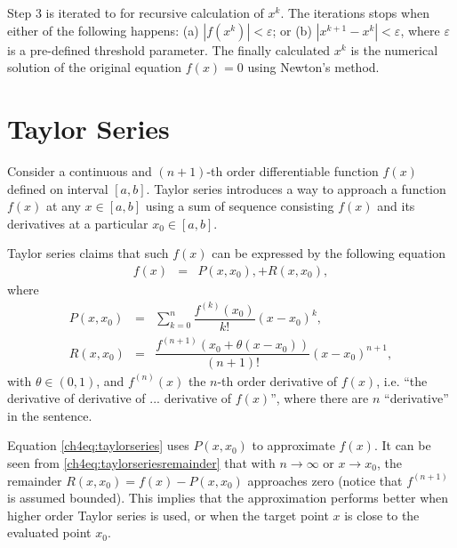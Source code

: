Step 3 is iterated to for recursive calculation of $x^{k}$. The iterations stops when either of the following happens: (a) $|f(x^k)| < \varepsilon$; or (b) $|x^{k+1}-x^k|<\varepsilon$, where $\varepsilon$ is a pre-defined threshold parameter. The finally calculated $x^k$ is the numerical solution of the original equation $f(x)=0$ using Newton's method.

\section{Taylor Series} \label{ch4sec:taylorseries}

Consider a continuous and $(n+1)$-th order differentiable function $f(x)$ defined on interval $[a, b]$. Taylor series introduces a way to approach a function $f(x)$ at any $x \in [a, b]$ using a sum of sequence consisting $f(x)$ and its derivatives at a particular $x_0 \in [a, b]$.

Taylor series claims that such $f(x)$ can be expressed by the following equation
\begin{eqnarray}
    f(x) &=& P(x,x_0), + R(x,x_0), \label{ch4eq:taylorseries}
\end{eqnarray}
where
\begin{eqnarray}
    P(x,x_0) &=& \sum_{k=0}^n \dfrac{f^{(k)}(x_0)}{k!}(x-x_0)^k, \nonumber \\
    R(x,x_0) &=& \dfrac{f^{(n+1)}\left(x_0 + \theta(x-x_0)\right)}{(n+1)!}(x-x_0)^{n+1}, \label{ch4eq:taylorseriesremainder}
\end{eqnarray}
with $\theta \in (0,1)$, and $f^{(n)}(x)$ the $n$-th order derivative of $f(x)$, i.e. ``the derivative of derivative of ... derivative of $f(x)$'', where there are $n$ ``derivative'' in the sentence.

Equation \eqref{ch4eq:taylorseries} uses $P(x,x_0)$ to approximate $f(x)$. It can be seen from \eqref{ch4eq:taylorseriesremainder} that with $n\rightarrow \infty$ or $x \rightarrow x_0$, the remainder $R(x,x_0) = f(x) - P(x,x_0)$ approaches zero (notice that $f^{(n+1)}$ is assumed bounded). This implies that the approximation performs better when higher order Taylor series is used, or when the target point $x$ is close to the evaluated point $x_0$.

